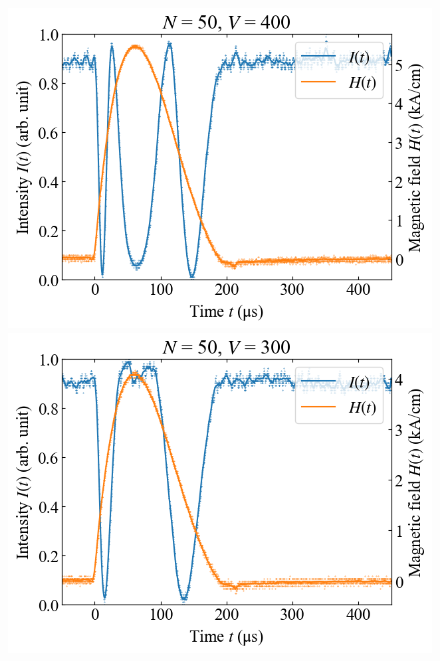 \documentclass[9pt,dvipdfmx,a4paper]{jsarticle}
\begin{document}
\begin{figure}[H]
    \centering
    \begin{minipage}[t]{0.24\columnwidth}
        \centering
        \includegraphics[width = \columnwidth]{xt/13.png}
    \end{minipage}
    \hfill
    \begin{minipage}[t]{0.24\columnwidth}
        \centering
        \includegraphics[width = \columnwidth]{xt/14.png}
    \end{minipage}
    \hfill
    \begin{minipage}[t]{0.24\columnwidth}
        \centering

\end{minipage}
\end{figure}
\end{document}
